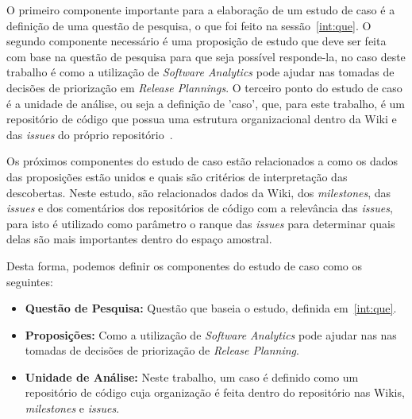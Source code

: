 O primeiro componente importante para a elaboração de um estudo de caso é a definição
de uma questão de pesquisa, o que foi feito na sessão~\ref{int:que}. O segundo
componente necessário é uma proposição de estudo que deve ser feita com base na questão 
de pesquisa para que seja possível responde-la, no caso deste trabalho é como a utilização de \textit{Software 
Analytics} pode ajudar nas tomadas de decisões de priorização em \textit{Release Plannings}.
O terceiro ponto do estudo de caso é a unidade de análise, ou seja a definição de 'caso',
que, para este trabalho, é um repositório de código que possua uma estrutura organizacional
dentro da Wiki e das \textit{issues} do próprio repositório~\cite{yin}.

Os próximos componentes do estudo de caso estão relacionados a como os dados das
proposições estão unidos e quais são critérios de interpretação das descobertas.
Neste estudo, são relacionados dados da Wiki, dos \textit{milestones}, das \textit{issues} 
e dos comentários dos repositórios de código com a relevância das \textit{issues}, para isto
é utilizado como parâmetro o ranque das \textit{issues} para determinar quais delas 
são mais importantes dentro do espaço amostral.

Desta forma, podemos definir os componentes do estudo de caso como os seguintes:

\begin{itemize}
    \item \textbf{Questão de Pesquisa:} Questão que baseia o estudo, definida em~\ref{int:que}.
    \item \textbf{Proposições:} Como a utilização de \textit{Software Analytics} pode ajudar nas
    nas tomadas de decisões de priorização de \textit{Release Planning}.
    \item \textbf{Unidade de Análise:} Neste trabalho, um caso é definido como um repositório
        de código cuja organização é feita dentro do repositório nas Wikis, \textit{milestones}
        e \textit{issues}.
\end{itemize}


